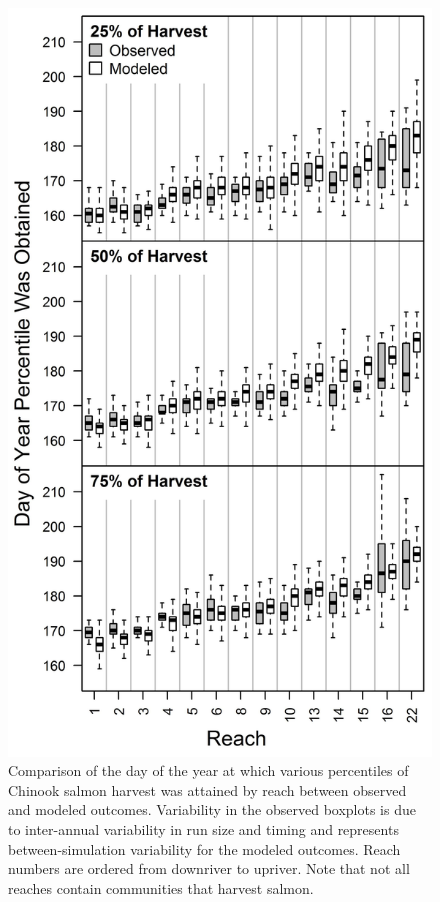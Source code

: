 \documentclass[12pt,]{book}
\theoremstyle{definition}
\theoremstyle{definition}
\theoremstyle{definition}
\theoremstyle{remark}
\begin{document}
\begin{figure}
  \centering
  \includegraphics{img/Ch3/FigureB2.jpg}
  \caption{Comparison of the day of the year at which various percentiles of Chinook salmon harvest was attained by reach between observed and modeled outcomes. Variability in the observed boxplots is due to inter-annual variability in run size and timing and represents between-simulation variability for the modeled outcomes. Reach numbers are ordered from downriver to upriver. Note that not all reaches contain communities that harvest salmon.}
  \label{fig:temporal-harvest}
\end{figure}
\end{document}
